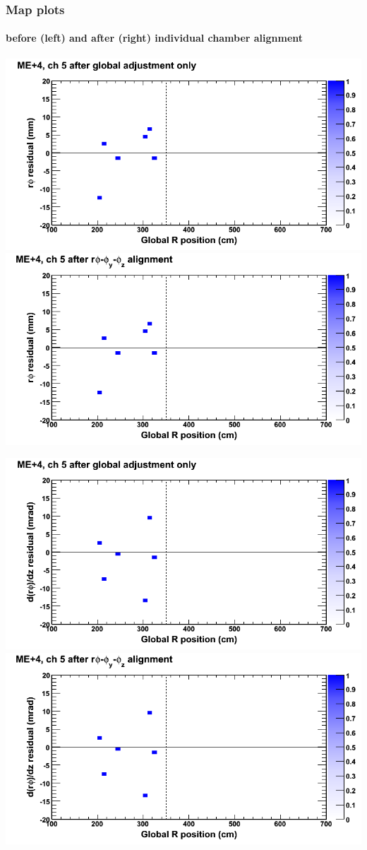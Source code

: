 \documentclass[compress]{beamer}
\begin{document}
\begin{frame}
\frametitle{Map plots}
\framesubtitle{before (left) and after (right) individual chamber alignment}
\includegraphics[width=0.5\linewidth]{ringmapplots_3dof/before_CSCvsr_mep4ch05_x.png} \includegraphics[width=0.5\linewidth]{ringmapplots_3dof/after_CSCvsr_mep4ch05_x.png}

\includegraphics[width=0.5\linewidth]{ringmapplots_3dof/before_CSCvsr_mep4ch05_dxdz.png} \includegraphics[width=0.5\linewidth]{ringmapplots_3dof/after_CSCvsr_mep4ch05_dxdz.png}
\end{frame}
\end{document}
